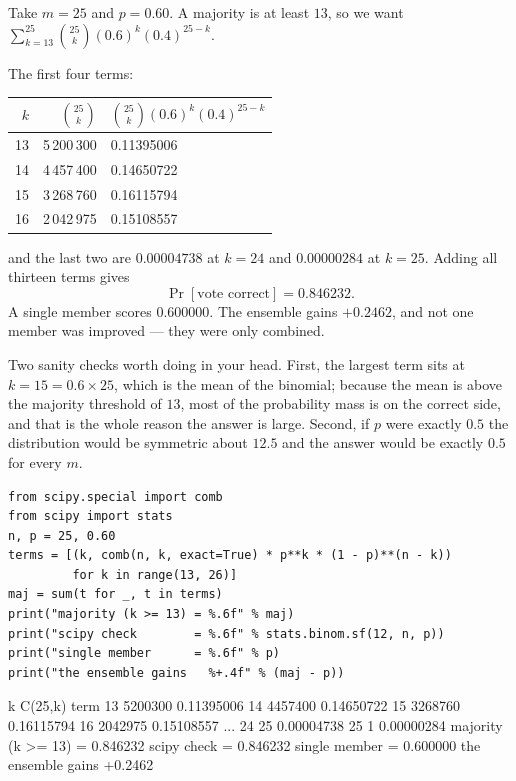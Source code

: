 \documentclass[11pt]{article}
\begin{document}
\begin{worked}
Take $m = 25$ and $p = 0.60$. A majority is at least $13$, so we want
$\sum_{k=13}^{25}\binom{25}{k}(0.6)^k(0.4)^{25-k}$.

The first four terms:
\begin{center}
\begin{tabular}{rrl}
  \toprule
  $k$ & $\binom{25}{k}$ & $\binom{25}{k}(0.6)^k(0.4)^{25-k}$ \\
  \midrule
  13 & 5\,200\,300 & 0.11395006 \\
  14 & 4\,457\,400 & 0.14650722 \\
  15 & 3\,268\,760 & 0.16115794 \\
  16 & 2\,042\,975 & 0.15108557 \\
  \bottomrule
\end{tabular}
\end{center}
and the last two are $0.00004738$ at $k = 24$ and $0.00000284$ at $k = 25$.
Adding all thirteen terms gives
\[
  \Pr[\text{vote correct}] = \mathbf{0.846232}.
\]
A single member scores $0.600000$. The ensemble gains $\mathbf{+0.2462}$, and
not one member was improved --- they were only combined.

Two sanity checks worth doing in your head. First, the largest term sits at
$k = 15 = 0.6 \times 25$, which is the mean of the binomial; because the mean
is above the majority threshold of $13$, most of the probability mass is on
the correct side, and that is the whole reason the answer is large. Second, if
$p$ were exactly $0.5$ the distribution would be symmetric about $12.5$ and
the answer would be exactly $0.5$ for every $m$.
\end{worked}

\begin{lstlisting}
from scipy.special import comb
from scipy import stats
n, p = 25, 0.60
terms = [(k, comb(n, k, exact=True) * p**k * (1 - p)**(n - k))
         for k in range(13, 26)]
maj = sum(t for _, t in terms)
print("majority (k >= 13) = %.6f" % maj)
print("scipy check        = %.6f" % stats.binom.sf(12, n, p))
print("single member      = %.6f" % p)
print("the ensemble gains   %+.4f" % (maj - p))
\end{lstlisting}
\begin{codeout}
k      C(25,k)          term
13       5200300      0.11395006
14       4457400      0.14650722
15       3268760      0.16115794
16       2042975      0.15108557
 ...
24            25      0.00004738
25             1      0.00000284
majority (k >= 13) = 0.846232
scipy check        = 0.846232
single member      = 0.600000
the ensemble gains   +0.2462
\end{codeout}
\end{document}
